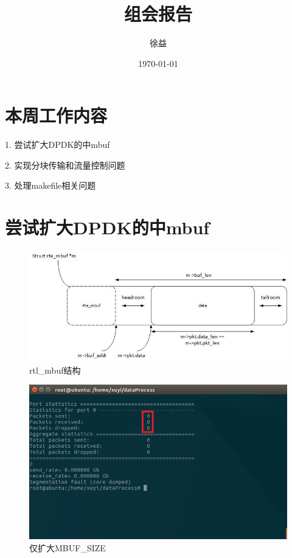 \documentclass{article}
\title{组会报告}
\author{徐益}
\date{\today}
\begin{document}
	
\maketitle


\section{本周工作内容}

1. 尝试扩大DPDK的中mbuf

2. 实现分块传输和流量控制问题

3. 处理makefile相关问题

\section{尝试扩大DPDK的中mbuf}
\begin{figure}[H]
	\centering
	\includegraphics[width = .8\textwidth]{structure_mbuf.jpg}
	\caption{rtl\_mbuf结构}
\end{figure}
\begin{figure}[H]
	\centering
	\includegraphics[width = .8\textwidth]{fault_dumped.png}
	\caption{仅扩大MBUF\_SIZE}
\end{figure}
\end{document}
